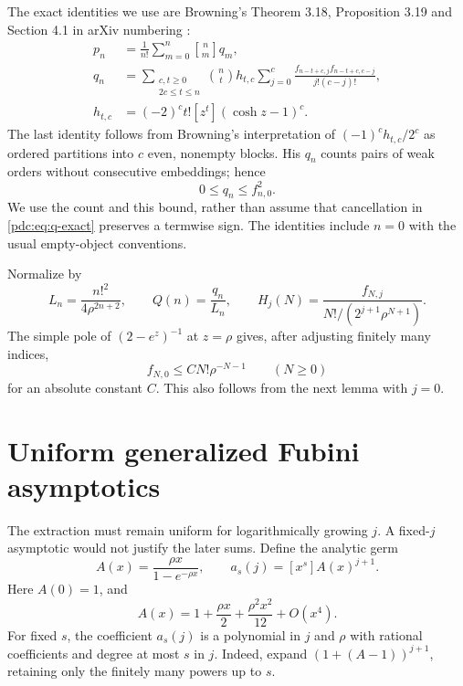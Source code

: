 \documentclass[11pt,letterpaper]{article}
\theoremstyle{remark}\newtheorem{remark}[theorem]{Remark}
\newcommand{\stirone}[2]{\genfrac{[}{]}{0pt}{}{#1}{#2}}
\newcommand{\coef}[2]{[#1^{#2}]}
\begin{document}
The exact identities we use are Browning's Theorem 3.18, Proposition 3.19 and Section 4.1 in arXiv numbering \cite{browning}:
\begin{align}
 p_n&=\frac1{n!}\sum_{m=0}^n\stirone{n}{m}q_m,\label{pdc:eq:p-exact}\\
 q_n&=\sum_{\substack{c,t\geq0\\2c\leq t\leq n}}
 \binom nt h_{t,c}\sum_{j=0}^c
 \frac{f_{n-t+c,j}f_{n-t+c,c-j}}{j!(c-j)!},\label{pdc:eq:q-exact}\\
 h_{t,c}&=(-2)^c t!\coef{z}{t}(\cosh z-1)^c.\label{pdc:eq:h-exact}
\end{align}
The last identity follows from Browning's interpretation of $(-1)^ch_{t,c}/2^c$ as ordered partitions into $c$ even, nonempty blocks. His $q_n$ counts pairs of weak orders without consecutive embeddings; hence
\begin{equation}\label{pdc:eq:qbound}
 0\leq q_n\leq f_{n,0}^2.
\end{equation}
We use the count and this bound, rather than assume that cancellation in \eqref{pdc:eq:q-exact} preserves a termwise sign. The identities include $n=0$ with the usual empty-object conventions.

Normalize by
\begin{equation}\label{pdc:eq:normalizations}
 L_n=\frac{n!^2}{4\rho^{2n+2}},\qquad
 Q(n)=\frac{q_n}{L_n},\qquad
 H_j(N)=\frac{f_{N,j}}{N!/(2^{j+1}\rho^{N+1})}.
\end{equation}
The simple pole of $(2-e^z)^{-1}$ at $z=\rho$ gives, after adjusting finitely many indices,
\begin{equation}\label{pdc:eq:fbound}
 f_{N,0}\leq C N!\rho^{-N-1}\qquad(N\geq0)
\end{equation}
for an absolute constant $C$. This also follows from the next lemma with $j=0$.

\section{Uniform generalized Fubini asymptotics}
\label{pdc:sec:poles}
The extraction must remain uniform for logarithmically growing $j$. A fixed-$j$ asymptotic would not justify the later sums. Define the analytic germ
\begin{equation}\label{pdc:eq:A}
 A(x)=\frac{\rho x}{1-e^{-\rho x}},\qquad
 a_s(j)=\coef{x}{s}A(x)^{j+1}.
\end{equation}
Here $A(0)=1$, and
\[
 A(x)=1+\frac{\rho x}{2}+\frac{\rho^2x^2}{12}+O(x^4).
\]
For fixed $s$, the coefficient $a_s(j)$ is a polynomial in $j$ and $\rho$ with rational coefficients and degree at most $s$ in $j$. Indeed, expand $(1+(A-1))^{j+1}$, retaining only the finitely many powers up to $s$.
\end{document}

